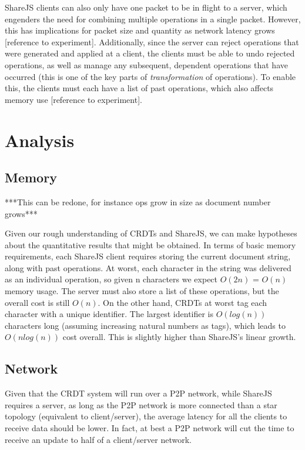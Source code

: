 \documentclass[12pt,a4paper,twoside,openright]{report}
\begin{document}
	ShareJS clients can also only have one packet to be in flight to a server, which engenders the need for combining multiple operations in a single packet. However, this has implications for packet size and quantity as network latency grows [reference to experiment]. Additionally, since the server can reject operations that were generated and applied at a client, the clients must be able to undo rejected operations, as well as manage any subsequent, dependent operations that have occurred (this is one of the key parts of \textit{transformation} of operations). To enable this, the clients must each have a list of past operations, which also affects memory use [reference to experiment].

	
\section{Analysis}
	
	\subsection{Memory}
	
	***This can be redone, for instance ops grow in size as document number grows***
	
	Given our rough understanding of CRDTs and ShareJS, we can make hypotheses about the quantitative results that might be obtained. In terms of basic memory requirements, each ShareJS client requires storing the current document string, along with past operations. At worst, each character in the string was delivered as an individual operation, so given n characters we expect $O(2n)$ = $O(n)$ memory usage. The server must also store a list of these operations, but the overall cost is still $O(n)$. On the other hand, CRDTs at worst tag each character with a unique identifier. The largest identifier is $O(log(n))$ characters long (assuming increasing natural numbers as tags), which leads to $O(nlog(n))$ cost overall. This is slightly higher than ShareJS's linear growth.
	
	\subsection{Network}
	
	Given that the CRDT system will run over a P2P network, while ShareJS requires a server, as long as the P2P network is more connected than a star topology (equivalent to client/server), the average latency for all the clients to receive data should be lower. In fact, at best a P2P network will cut the time to receive an update to half of a client/server network. 
	
\end{document}
